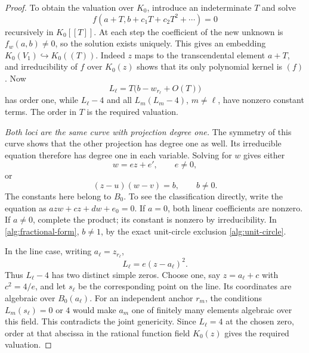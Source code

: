 \begin{proof}
To obtain the valuation over \(K_0\), introduce an indeterminate
\(T\) and solve
\[
 f(a+T,b+c_1T+c_2T^2+\cdots)=0
\]
recursively in \(K_0[[T]]\). At each step the coefficient of the new
unknown is \(f_w(a,b)\ne0\), so the solution exists uniquely.
This gives an embedding \(K_0(V_1)\hookrightarrow K_0((T))\).
Indeed \(z\) maps to the transcendental element \(a+T\), and
irreducibility of \(f\) over \(K_0(z)\) shows that its only
polynomial kernel is \((f)\). Now
\[
 L_\ell=T\bigl(b-w_{r_\ell}+O(T)\bigr)
\]
has order one, while \(L_\ell-4\) and all
\(L_m(L_m-4)\), \(m\ne\ell\), have nonzero constant terms.
The order in \(T\) is the required valuation.

\emph{Both loci are the same curve with projection degree one.}
The symmetry of this curve shows that the other projection has degree
one as well. Its irreducible equation therefore has degree one in
each variable. Solving for \(w\) gives either
\begin{equation}\label{alg:line-form}
 w=ez+e',\qquad e\ne0,
\end{equation}
or
\begin{equation}\label{alg:fractional-form}
 (z-u)(w-v)=b,\qquad b\ne0.
\end{equation}
The constants here belong to \(B_0\). To see the classification
directly, write the equation as \(azw+cz+dw+e_0=0\). If \(a=0\),
both linear coefficients are nonzero. If \(a\ne0\), complete the
product; its constant is nonzero by irreducibility. In
\eqref{alg:fractional-form}, \(b\ne1\), by the exact unit-circle
exclusion \eqref{alg:unit-circle}.

In the line case, writing \(a_\ell=z_{r_\ell}\),
\[
 L_\ell=e(z-a_\ell)^2.
\]
Thus \(L_\ell-4\) has two distinct simple zeros. Choose one, say
\(z=a_\ell+c\) with \(c^2=4/e\), and let \(s_\ell\) be the
corresponding point on the line. Its coordinates are algebraic over
\(B_0(a_\ell)\). For an independent anchor \(r_m\), the conditions
\(L_m(s_\ell)=0\) or \(4\) would make \(a_m\) one of finitely
many elements algebraic over this field. This contradicts the joint
genericity. Since \(L_\ell=4\) at the chosen zero, order at that
abscissa in the rational function field \(K_0(z)\) gives the required
valuation.


\end{proof}
